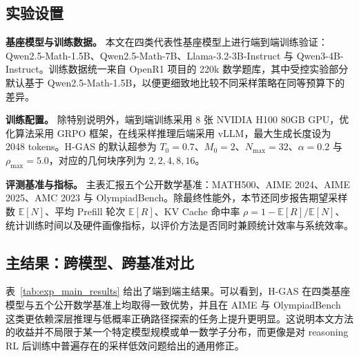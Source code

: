 \subsection{实验设置}

\textbf{基座模型与训练数据。} 本文在四类代表性基座模型上进行端到端训练验证：Qwen2.5-Math-1.5B、Qwen2.5-Math-7B、Llama-3.2-3B-Instruct 与 Qwen3-4B-Instruct。训练数据统一来自 OpenR1 项目的 220k 数学题库，其中受控实验部分默认基于 Qwen2.5-Math-1.5B，以便更细致地比较不同采样策略在同等预算下的差异。

\textbf{训练配置。} 除特别说明外，端到端训练采用 8 张 NVIDIA H100 80GB GPU，优化算法采用 GRPO 框架，在线采样推理后端采用 vLLM，最大生成长度设为 2048 tokens。H-GAS 的默认超参为 $T_0=0.7$、$M_0=2$、$N_{\max}=32$、$\alpha=0.2$ 与 $\rho_{\max}=5.0$，对应的几何块序列为 $2,2,4,8,16$。

\textbf{评测基准与指标。} 主表汇报五个公开数学基准：MATH500、AIME 2024、AIME 2025、AMC 2023 与 OlympiadBench。除最终性能外，本节还同步报告期望采样数 $\mathbb{E}[N]$、平均 Prefill 轮次 $\mathbb{E}[R]$、KV Cache 命中率 $\rho=1-\mathbb{E}[R]/\mathbb{E}[N]$、统计训练时间以及硬件画像指标，以评价方法是否同时兼顾统计效率与系统效率。

\subsection{主结果：跨模型、跨基准对比}

表~\ref{tab:exp_main_results} 给出了端到端主结果。可以看到，H-GAS 在四类基座模型与五个公开数学基准上均取得一致优势，并且在 AIME 与 OlympiadBench 这类更依赖深层推理与低概率正确路径探索的任务上提升更明显。这说明本文方法的收益并不局限于某一个特定模型规模或单一数学子分布，而更像是对 reasoning RL 后训练中普遍存在的采样低效问题给出的通用修正。

